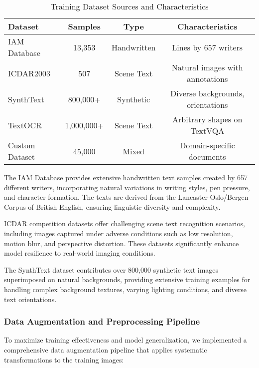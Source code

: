 \begin{table}[H]
\centering
\caption{Training Dataset Sources and Characteristics}
\label{tab:training_datasets}
{\begin{tabular}{lccc}
\toprule
\textbf{Dataset} & \textbf{Samples} & \textbf{Type} & \textbf{Characteristics} \\
\midrule
IAM Database & 13,353 & Handwritten & Lines by 657 writers \\
ICDAR2003 & 507 & Scene Text & Natural images with annotations \\
SynthText & 800,000+ & Synthetic & Diverse backgrounds, orientations \\
TextOCR & 1,000,000+ & Scene Text & Arbitrary shapes on TextVQA \\
Custom Dataset & 45,000 & Mixed & Domain-specific documents \\
\bottomrule
\end{tabular}}
\end{table}

The IAM Database provides extensive handwritten text samples created by 657 different writers, incorporating natural variations in writing styles, pen pressure, and character formation. The texts are derived from the Lancaster-Oslo/Bergen Corpus of British English, ensuring linguistic diversity and complexity.

ICDAR competition datasets offer challenging scene text recognition scenarios, including images captured under adverse conditions such as low resolution, motion blur, and perspective distortion. These datasets significantly enhance model resilience to real-world imaging conditions.

The SynthText dataset contributes over 800,000 synthetic text images superimposed on natural backgrounds, providing extensive training examples for handling complex background textures, varying lighting conditions, and diverse text orientations.

\subsubsection{Data Augmentation and Preprocessing Pipeline}

To maximize training effectiveness and model generalization, we implemented a comprehensive data augmentation pipeline that applies systematic transformations to the training images:

